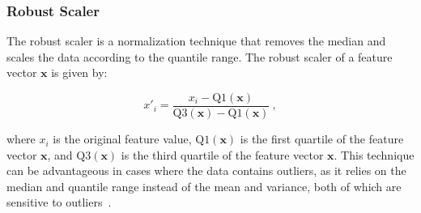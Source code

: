 \subsubsection{Robust Scaler}
The robust scaler is a normalization technique that removes the median and scales the data according to the quantile range.
The robust scaler of a feature vector $\mathbf{x}$ is given by:

$$
x'_i = \frac{x_i - \text{Q1}(\mathbf{x})}{\text{Q3}(\mathbf{x}) - \text{Q1}(\mathbf{x})} \: ,
$$

where $x_i$ is the original feature value, $\text{Q1}(\mathbf{x})$ is the first quartile of the feature vector $\mathbf{x}$, and $\text{Q3}(\mathbf{x})$ is the third quartile of the feature vector $\mathbf{x}$.
This technique can be advantageous in cases where the data contains outliers, as it relies on the median and quantile range instead of the mean and variance, both of which are sensitive to outliers~\cite{Vasques2024}.